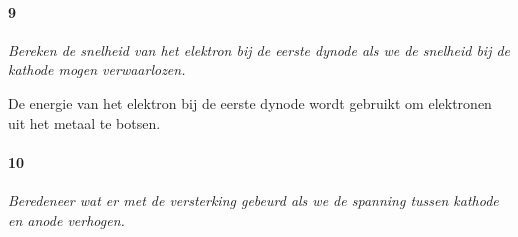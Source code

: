 \paragraph{9}

\textit{Bereken de snelheid van het elektron bij de eerste dynode
als we de snelheid bij de kathode mogen verwaarlozen.}

De energie van het elektron bij de eerste dynode wordt gebruikt om
elektronen uit het metaal te botsen.


\paragraph{10}

\textit{Beredeneer wat er met de versterking gebeurd als we de spanning
tussen kathode en anode verhogen.}


